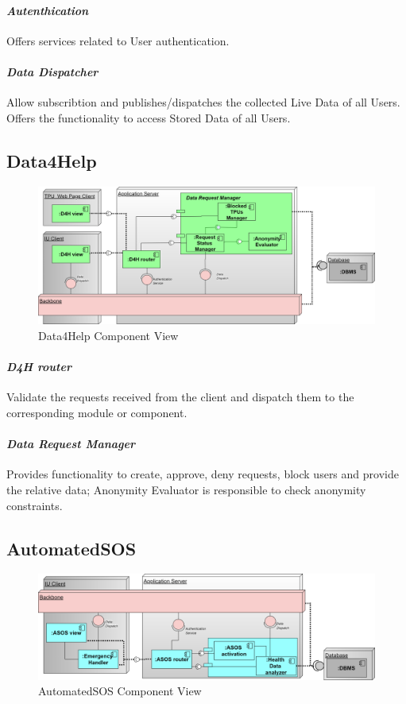 \paragraph{\textit{Autenthication}} Offers services related to  User authentication.
\paragraph{\textit{Data Dispatcher}} Allow subscribtion and publishes/dispatches the collected Live Data of all Users. Offers the functionality to access Stored Data of all Users.
\clearpage
\subsection{Data4Help}
\label{subsect:D4HComponentView}
\begin{figure}[H]
\caption{Data4Help Component View}
\includegraphics[width = \textwidth]{sections/architecturalDesign/D4HDiagram.png}
\end{figure}
\paragraph{\textit{D4H router}} Validate the requests received from the client and dispatch them to the corresponding module or component.
\paragraph{\textit{Data Request Manager}} Provides functionality to create, approve, deny requests, block users and provide the relative data; Anonymity Evaluator is responsible to check anonymity constraints. 
\subsection{AutomatedSOS}
\label{subsect:ASOSComponentView}
\begin{figure}[H]
 \caption{AutomatedSOS Component View}
\centering
\includegraphics[width = \textwidth]{sections/architecturalDesign/ASOSDiagram.png}
\end{figure}
